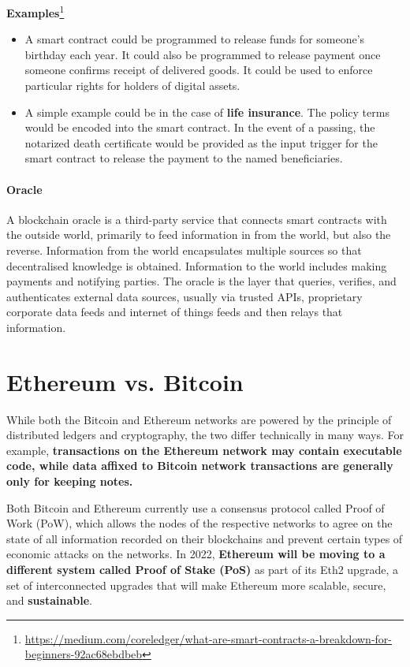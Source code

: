 \textbf{Examples}\footnote{\url{https://medium.com/coreledger/what-are-smart-contracts-a-breakdown-for-beginners-92ac68ebdbeb}}
\begin{itemize}
    \item A smart contract could be programmed to release funds for someone's birthday each year. It could also be programmed to release payment once someone confirms receipt of delivered goods. It could be used to enforce particular rights for holders of digital assets.
    \item A simple example could be in the case of \textbf{life insurance}. The policy terms would be encoded into the smart contract. In the event of a passing, the notarized death certificate would be provided as the input trigger for the smart contract to release the payment to the named beneficiaries.
\end{itemize}

\paragraph{Oracle} A blockchain oracle is a third-party service that connects smart contracts with the outside world, primarily to feed information in from the world, but also the reverse. Information from the world encapsulates multiple sources so that decentralised knowledge is obtained. Information to the world includes making payments and notifying parties. The oracle is the layer that queries, verifies, and authenticates external data sources, usually via trusted APIs, proprietary corporate data feeds and internet of things feeds and then relays that information.

\section{Ethereum vs. Bitcoin}

While both the Bitcoin and Ethereum networks are powered by the principle of distributed ledgers and cryptography, the two differ technically in many ways. For example, \textbf{transactions on the Ethereum network may contain executable code, while data affixed to Bitcoin network transactions are generally only for keeping notes.}

Both Bitcoin and Ethereum currently use a consensus protocol called Proof of Work (PoW), which allows the nodes of the respective networks to agree on the state of all information recorded on their blockchains and prevent certain types of economic attacks on the networks. In 2022, \textbf{Ethereum will be moving to a different system called Proof of Stake (PoS)} as part of its Eth2 upgrade, a set of interconnected upgrades that will make Ethereum more scalable, secure, and \textbf{sustainable}.

